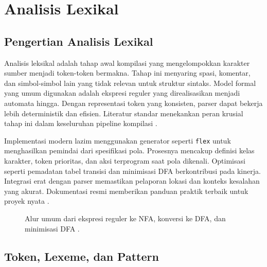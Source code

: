 \documentclass[../main.tex]{subfiles}
\begin{document}
\chapter{Analisis Lexikal}

\section{Pengertian Analisis Lexikal}
Analisis leksikal adalah tahap awal kompilasi yang mengelompokkan karakter sumber menjadi token-token bermakna. Tahap ini menyaring spasi, komentar, dan simbol-simbol lain yang tidak relevan untuk struktur sintaks. Model formal yang umum digunakan adalah ekspresi reguler yang direalisasikan menjadi automata hingga. Dengan representasi token yang konsisten, parser dapat bekerja lebih deterministik dan efisien. Literatur standar menekankan peran krusial tahap ini dalam keseluruhan pipeline kompilasi \citep{Mogensen2010,Wirth1996}.

Implementasi modern lazim menggunakan generator seperti \texttt{flex} untuk menghasilkan pemindai dari spesifikasi pola. Prosesnya mencakup definisi kelas karakter, token prioritas, dan aksi terprogram saat pola dikenali. Optimisasi seperti pemadatan tabel transisi dan minimisasi DFA berkontribusi pada kinerja. Integrasi erat dengan parser memastikan pelaporan lokasi dan konteks kesalahan yang akurat. Dokumentasi resmi memberikan panduan praktik terbaik untuk proyek nyata \citep{FlexManual}.

\begin{figure}[t]
  \centering
  \caption{Alur umum dari ekspresi reguler ke NFA, konversi ke DFA, dan minimisasi DFA \citep{WikiRegex,WikiNFA,WikiDFA,WikiDFAMin}.}
  \label{fig:re-nfa-dfa}
\end{figure}

\section{Token, Lexeme, dan Pattern}
\end{document}
